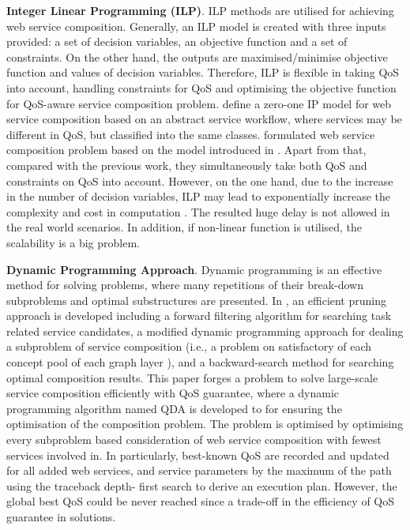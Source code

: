 \textbf{Integer Linear Programming (ILP)}. ILP methods are utilised for achieving web service composition. Generally, an ILP model is created with three inputs provided: a set of decision variables, an objective function and a set of constraints. On the other hand, the outputs are maximised/minimise objective function and values of decision variables. Therefore, ILP is flexible in taking QoS into account, handling constraints for QoS and optimising the objective function for QoS-aware service composition problem. \cite{gao2005web} define a zero-one IP model for web service composition based on an abstract service workflow, where services may be different in QoS, but classified into the same classes.  \cite{yoo2008web} formulated web service composition problem based on the model introduced in \cite{gao2005web}. Apart from that, compared with the previous work, they simultaneously take both QoS and constraints on QoS into account. However, on the one hand, due to the increase in the number of decision variables, ILP may lead to exponentially increase the complexity and cost in computation \cite{li2016full}. The resulted huge delay is not allowed in the real world scenarios. In addition, if non-linear function is utilised, the scalability is a big problem.
 
\textbf{Dynamic Programming Approach}. Dynamic programming is an effective method for solving problems, where many repetitions of their break-down subproblems and optimal substructures are presented. In  \cite{huang2009effective}, an efficient pruning approach is developed including a forward filtering algorithm for searching task related service candidates, a modified dynamic programming approach for dealing a subproblem of service composition (i.e.,  a  problem on satisfactory of each concept pool of each graph layer ), and a backward-search method for searching optimal composition results. This paper \cite{xu2012towards} forges a problem to solve large-scale service composition efficiently with QoS guarantee, where a dynamic programming algorithm named QDA is developed to for ensuring the optimisation of the composition problem. The problem is optimised by optimising every subproblem based consideration of web service composition with fewest services involved in.  In particularly, best-known QoS are recorded and updated for all added web services, and service parameters by the maximum of the path using the traceback depth- first search to derive an execution plan. However, the global best QoS could be never reached since a trade-off in the efficiency of QoS guarantee in solutions.


